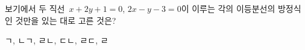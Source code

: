 보기에서 두 직선~$x+2y+1=0$, $2x-y-3=0$이 이루는 각의 이등분선의 방정식인 것만을 있는 대로 고른 것은? 
\begin{choices32}{ㄱ, ㄴ}{ㄱ, ㄹ}{ㄴ, ㄷ}{ㄴ, ㄹ}{ㄷ, ㄹ}\end{choices32}
